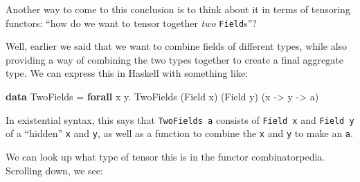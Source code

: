 \documentclass[]{article}
\newenvironment{Shaded}{}{}
\newcommand{\DataTypeTok}[1]{\textcolor[rgb]{0.56,0.13,0.00}{#1}}
\newcommand{\KeywordTok}[1]{\textcolor[rgb]{0.00,0.44,0.13}{\textbf{#1}}}
\newcommand{\NormalTok}[1]{#1}
\newcommand{\OperatorTok}[1]{\textcolor[rgb]{0.40,0.40,0.40}{#1}}
\newcommand{\OtherTok}[1]{\textcolor[rgb]{0.00,0.44,0.13}{#1}}
\begin{document}
Another way to come to this conclusion is to think about it in terms of
tensoring functors: ``how do we want to tensor together \emph{two}
\texttt{Field}s''?

Well, earlier we said that we want to combine fields of different types, while
also providing a way of combining the two types together to create a final
aggregate type. We can express this in Haskell with something like:

\begin{Shaded}
\begin{Highlighting}[]
\KeywordTok{data} \DataTypeTok{TwoFields} \OtherTok{=} \KeywordTok{forall}\NormalTok{ x y}\OperatorTok{.} \DataTypeTok{TwoFields}\NormalTok{ (}\DataTypeTok{Field}\NormalTok{ x) (}\DataTypeTok{Field}\NormalTok{ y) (x }\OtherTok{{-}>}\NormalTok{ y }\OtherTok{{-}>}\NormalTok{ a)}
\end{Highlighting}
\end{Shaded}

In existential syntax, this says that \texttt{TwoFields\ a} consists of
\texttt{Field\ x} and \texttt{Field\ y} of a ``hidden'' \texttt{x} and
\texttt{y}, as well as a function to combine the \texttt{x} and \texttt{y} to
make an \texttt{a}.

We can look up what type of tensor this is in the functor combinatorpedia.
Scrolling down, we see:
\end{document}
